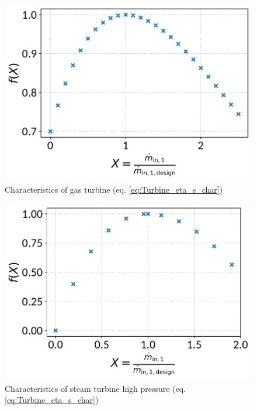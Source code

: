 \begin{minipage}{0.5\textwidth}
\begin{figure}[H]\begin{center}
\includegraphics[width=\textwidth]{figures/Turbine_CharLine_eta_s_char_gas_turbine.pdf}
\caption{Characteristics of gas turbine (eq. \ref{eq:Turbine_eta_s_char})}
\label{fig:CharLine_eta_s_char_gas turbine}
\end{center}\end{figure}

\end{minipage}
\begin{minipage}{0.5\textwidth}
\begin{figure}[H]\begin{center}
\includegraphics[width=\textwidth]{figures/Turbine_CharLine_eta_s_char_steam_turbine_high_pressure.pdf}
\caption{Characteristics of steam turbine high pressure (eq. \ref{eq:Turbine_eta_s_char})}
\label{fig:CharLine_eta_s_char_steam turbine high pressure}
\end{center}\end{figure}

\end{minipage}

